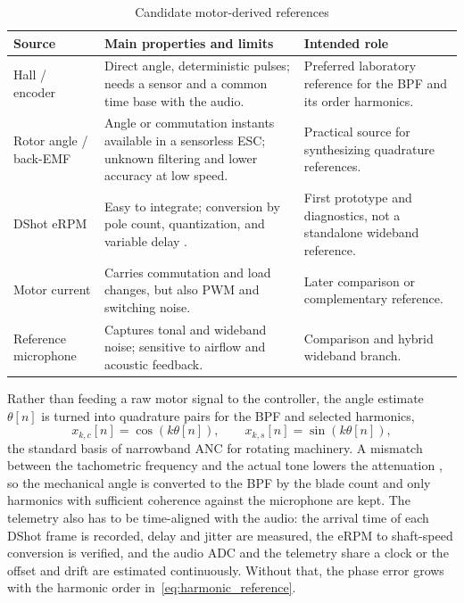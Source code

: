 \documentclass[conference]{IEEEtran}
\begin{document}
\begin{table}[htbp]
\caption{Candidate motor-derived references}
\label{tab:real_references}
\centering
\scriptsize
\setlength{\tabcolsep}{3pt}
\begin{tabularx}{\columnwidth}{@{}>{\raggedright\arraybackslash}p{}YY@{}}
\toprule
Source & Main properties and limits & Intended role \\
\midrule
Hall / encoder & Direct angle, deterministic pulses; needs a sensor and a common time base with the audio. & Preferred laboratory reference for the BPF and its order harmonics. \\
Rotor angle / back-EMF & Angle or commutation instants available in a sensorless ESC; unknown filtering and lower accuracy at low speed. & Practical source for synthesizing quadrature references. \\
DShot eRPM & Easy to integrate; conversion by pole count, quantization, and variable delay \cite{betaflightDshotRpm,ardupilotEscTelemetry}. & First prototype and diagnostics, not a standalone wideband reference. \\
Motor current & Carries commutation and load changes, but also PWM and switching noise. & Later comparison or complementary reference. \\
Reference microphone & Captures tonal and wideband noise; sensitive to airflow and acoustic feedback. & Comparison and hybrid wideband branch. \\
\bottomrule
\end{tabularx}
\end{table}

Rather than feeding a raw motor signal to the controller, the angle estimate $\theta[n]$ is turned into quadrature pairs for the BPF and selected harmonics,
\begin{equation}
 x_{k,c}[n]=\cos(k\theta[n]),\qquad
 x_{k,s}[n]=\sin(k\theta[n]),
 \label{eq:harmonic_reference}
\end{equation}
the standard basis of narrowband ANC for rotating machinery. A mismatch between the tachometric frequency and the actual tone lowers the attenuation \cite{xiao2006narrowband}, so the mechanical angle is converted to the BPF by the blade count and only harmonics with sufficient coherence against the microphone are kept. The telemetry also has to be time-aligned with the audio: the arrival time of each DShot frame is recorded, delay and jitter are measured, the eRPM to shaft-speed conversion is verified, and the audio ADC and the telemetry share a clock or the offset and drift are estimated continuously. Without that, the phase error grows with the harmonic order in~\eqref{eq:harmonic_reference}.
\end{document}
